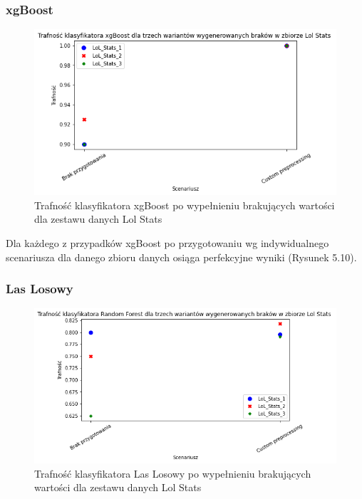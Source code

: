 \documentclass{book}
\begin{document}
\subsubsection{xgBoost}
    \begin{figure}[H]
    \centerline{\includegraphics[scale=0.5]{Lol_stats_xgb_Custom}}
    \centering
    \caption{Trafność klasyfikatora xgBoost po wypełnieniu brakujących wartości dla zestawu danych Lol Stats}
    \end{figure}

    Dla każdego z przypadków xgBoost po przygotowaniu wg indywidualnego 
    scenariusza dla danego zbioru danych osiąga perfekcyjne wyniki (Rysunek 5.10). 

\subsubsection{Las Losowy}
    \begin{figure}[H]
    \centerline{\includegraphics[scale=0.5]{Lol_stats_rfc_Custom}}
    \centering
    \caption{Trafność klasyfikatora Las Losowy po wypełnieniu brakujących wartości dla zestawu danych Lol Stats}
    \end{figure}
\end{document}
